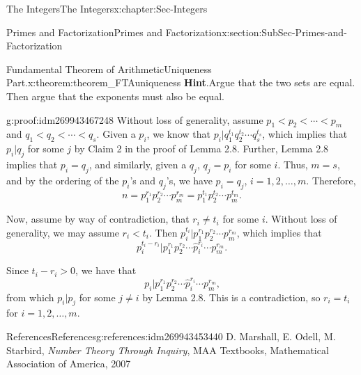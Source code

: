 \documentclass[oneside,10pt,]{book}
\numberwithin{equation}{section}
\newcommand{\lt}{<}
\begin{document}
\begin{chapterptx}{The Integers}{}{The Integers}{}{}{x:chapter:Sec-Integers}
\begin{sectionptx}{Primes and Factorization}{}{Primes and Factorization}{}{}{x:section:SubSec-Primes-and-Factorization}
\begin{theorem}{Fundamental Theorem of Arithmetic\textendash{}Uniqueness Part.}{}{x:theorem:theorem_FTAuniqueness}
\textbf{Hint}.\quad{}Argue that the two sets are equal. Then argue that the exponents must also be equal.%
\end{theorem}
\begin{proofptx}{}{g:proof:idm269943467248}
Without loss of generality, assume \(p_1 \lt  p_2 \lt  \cdots \lt  p_m\) and \(q_1 \lt  q_2 \lt  \cdots \lt  q_s\). Given a \(p_i\), we know that \(p_i | q_1^{t_1} q_2^{t_2} \cdots q_s^{t_s}\), which implies that \(p_i | q_j\) for some \(j\) by Claim 2 in the proof of Lemma 2.8. Further, Lemma 2.8 implies that \(p_i = q_j\), and similarly, given a \(q_j\), \(q_j = p_i\) for some \(i\). Thus, \(m =s\), and by the ordering of the \(p_i\)'s and \(q_j\)'s, we have \(p_i = q_j\), \(i = 1, 2, \ldots, m\). Therefore,%
\begin{equation*}
n = p_1^{r_1} p_2^{r_2} \cdots p_m^{r_m} = p_1^{t_1} p_2^{t_2} \cdots p_m^{t_m}\text{.}
\end{equation*}
%
\par
Now, assume by way of contradiction, that \(r_i \ne t_i\) for some \(i\). Without loss of generality, we may assume \(r_i \lt  t_i\). Then \(p_i^{t_i} | p_1^{r_1} p_2^{r_2} \cdots p_m^{r_m}\), which implies that%
\begin{equation*}
p_i^{t_i - r_i} | p_1^{r_1} p_2^{r_2} \cdots \hat{p}_i^{r_i} \cdots p_m^{r_m}\text{.}
\end{equation*}
%
\par
Since \(t_i - r_i > 0\), we have that%
\begin{equation*}
p_i  | p_1^{r_1} p_2^{r_2} \cdots \hat{p}_i^{r_i} \cdots p_m^{r_m}\text{,}
\end{equation*}
from which \(p_i | p_j\) for some \(j\ne i\) by Lemma 2.8. This is a contradiction, so \(r_i = t_i\) for \(i = 1, 2, \ldots, m\).%
\end{proofptx}
%
%
\typeout{************************************************}
\typeout{************************************************}
%
\begin{references-subsection-numberless}{References}{}{References}{}{}{g:references:idm269943453440}
D. Marshall, E. Odell, M. Starbird, \emph{Number Theory Through Inquiry}, MAA Textbooks, Mathematical Association of America, 2007\end{references-subsection-numberless}
\end{sectionptx}
%
%
\typeout{************************************************}
\typeout{************************************************}

\end{chapterptx}
\end{document}
